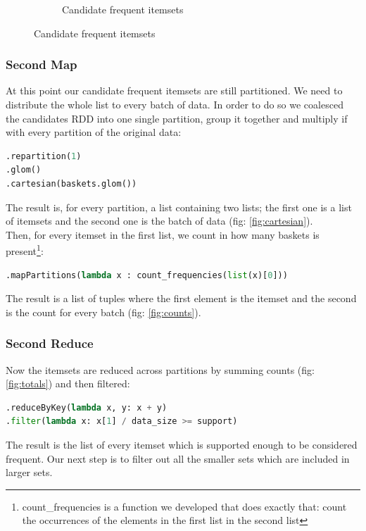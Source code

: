 \documentclass[a4paper]{article}
\begin{document}
\begin{figure}[h]
\begin{subfigure}[b]{0.24\textwidth}
         	\caption{Candidate frequent itemsets}
         	\label{fig:candidate_fi}
		\end{subfigure}
	
	\end{figure}
	
	\subsubsection{Second Map}
	At this point our candidate frequent itemsets are still partitioned. We need to distribute the whole list to every batch of data. In order to do so we coalesced the candidates RDD into one single partition, group it together and multiply if with every partition of the original data:
	\begin{lstlisting}[language=Python]
.repartition(1)
.glom()
.cartesian(baskets.glom())
	\end{lstlisting}
	The result is, for every partition, a list containing two lists; the first one is a list of itemsets and the second one is the batch of data (fig: \ref{fig:cartesian}).\\
	Then, for every itemset in the first list, we count in how many baskets is present\footnote{count\_frequencies is a function we developed that does exactly that: count the occurrences of the elements in the first list in the second list}:
	\begin{lstlisting}[language=Python]
.mapPartitions(lambda x : count_frequencies(list(x)[0])) 
	\end{lstlisting}
	The result is a list of tuples where the first element is the itemset and the second is the count for every batch (fig: \ref{fig:counts}).
	
	
	\subsubsection{Second Reduce}
	Now the itemsets are reduced across partitions by summing counts (fig: \ref{fig:totals}) and then filtered:
	\begin{lstlisting}[language=Python]
.reduceByKey(lambda x, y: x + y)
.filter(lambda x: x[1] / data_size >= support)
	\end{lstlisting}
	
	The result is the list of every itemset which is supported enough to be considered frequent. Our next step is to filter out all the smaller sets which are included in larger sets.
	
	
		
\end{document}
